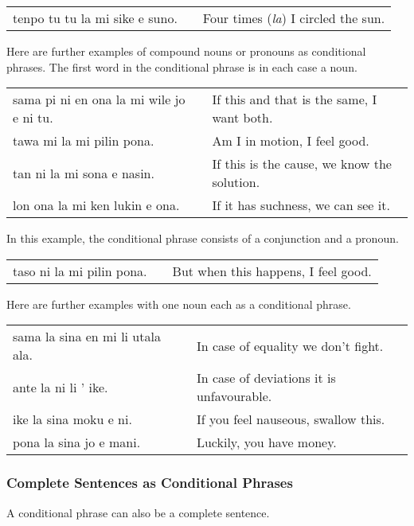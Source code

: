 \begin{supertabular}{p{5,5cm}|ll}
tenpo tu tu la mi sike e suno. && Four times (\textit{la}) I circled the sun. \\
\end{supertabular} 

Here are further examples of compound nouns or pronouns as conditional phrases. 
The first word in the conditional phrase is in each case a noun.

\begin{supertabular}{p{5,5cm}|ll}
sama pi ni en ona la mi wile jo e ni tu. &&  If this and that is the same, I want both.\\
tawa mi la mi pilin pona. && Am I in motion, I feel good. \\
tan ni la mi sona e nasin. && If this is the cause, we know the solution. \\
lon ona la mi ken lukin e ona. && If it has suchness, we can see it. \\
\end{supertabular} 

In this example, the conditional phrase consists of a conjunction and a pronoun. 

\begin{supertabular}{p{5,5cm}|ll}
taso ni la mi pilin pona. && But when this happens, I feel good. \\
\end{supertabular} 

Here are further examples with one noun each as a conditional phrase.

\begin{supertabular}{p{5,5cm}|ll}
sama la sina en mi li utala ala. && In case of equality we don't fight. \\
ante la ni li ' ike. && In case of deviations it is unfavourable.  \\
ike la sina moku e ni. && If you feel nauseous, swallow this. \\
pona la sina jo e mani. && Luckily, you have money. \\
\end{supertabular} 

%
%
\subsubsection*{Complete Sentences as Conditional Phrases}
%
%
A conditional phrase can also be a complete sentence.

